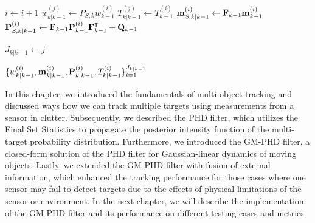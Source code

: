 \begin{algorithm}
\begin{algorithmic}[1]
         
            \State $i \gets i + 1$
            \State $w_{k|k-1}^{(j)} \gets P_{S,k} w_{k-1}^{(i)}$
            \State $T_{k|k-1}^{(j)} \gets T_{k-1}^{(i)}$
            \State $\vecat{m}{S,k|k-1}^{(i)} \gets \vecat{F}{k-1}\vecat{m}{k-1}^{(i)}$
            \State $\vecat{P}{S,k|k-1}^{(i)} \gets \vecat{F}{k-1} \vecat{P}{k-1}^{(i)} \vecat{F}{k-1}^\intercal + \vecat{Q}{k-1}$
        \EndFor

        \State $J_{k|k-1} \gets j$
        
        \State \Return $\{ w_{k|k-1}^{(i)}, \vecat{m}{k|k-1}^{(i)}, \vecat{P}{k|k-1}^{(i)}, T_{k|k-1}^{(i)}\}_{i=1}^{J_{k|k-1}}$
    \EndProcedure

\end{algorithmic}
\end{algorithm}

In this chapter, we introduced the fundamentals of multi-object tracking and discussed ways how we can track multiple targets using measurements from a sensor in clutter. Subsequently, we described the PHD filter, which utilizes the Final Set Statistics to propagate the posterior intensity function of the multi-target probability distribution. Furthermore, we introduced the GM-PHD filter, a closed-form solution of the PHD filter for Gaussian-linear dynamics of moving objects. Lastly, we extended the GM-PHD filter with fusion of external information, which enhanced the tracking performance for those cases where one sensor may fail to detect targets due to the effects of physical limitations of the sensor or environment. In the next chapter, we will describe the implementation of the GM-PHD filter and its performance on different testing cases and metrics.

